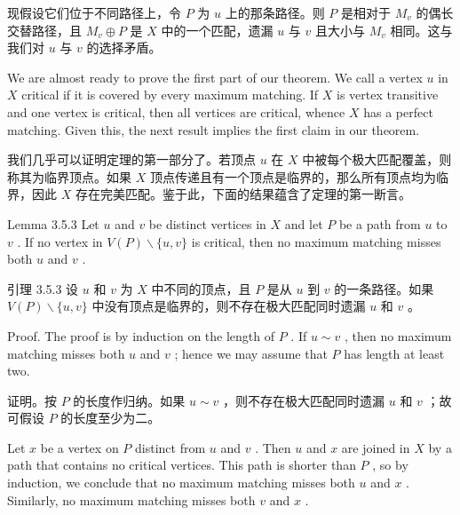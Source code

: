\documentclass[10pt]{article}
\begin{document}
\begin{tcolorbox}\relax
现假设它们位于不同路径上，令 \(P\) 为 \(u\) 上的那条路径。则 \(P\) 是相对于 \({M}_{v}\) 的偶长交替路径，且 \({M}_{v} \oplus  P\) 是 \(X\) 中的一个匹配，遗漏 \(u\) 与 \(v\) 且大小与 \({M}_{v}\) 相同。这与我们对 \(u\) 与 \(v\) 的选择矛盾。
\end{tcolorbox}

We are almost ready to prove the first part of our theorem. We call a vertex \(u\) in \(X\) critical if it is covered by every maximum matching. If \(X\) is vertex transitive and one vertex is critical, then all vertices are critical, whence \(X\) has a perfect matching. Given this, the next result implies the first claim in our theorem.

\begin{tcolorbox}\relax
我们几乎可以证明定理的第一部分了。若顶点 \(u\) 在 \(X\) 中被每个极大匹配覆盖，则称其为临界顶点。如果 \(X\) 顶点传递且有一个顶点是临界的，那么所有顶点均为临界，因此 \(X\) 存在完美匹配。鉴于此，下面的结果蕴含了定理的第一断言。
\end{tcolorbox}

Lemma 3.5.3 Let \(u\) and \(v\) be distinct vertices in \(X\) and let \(P\) be a path from \(u\) to \(v\) . If no vertex in \(V\left( P\right)  \smallsetminus  \{ u,v\}\) is critical, then no maximum matching misses both \(u\) and \(v\) .

\begin{tcolorbox}\relax
引理 3.5.3 设 \(u\) 和 \(v\) 为 \(X\) 中不同的顶点，且 \(P\) 是从 \(u\) 到 \(v\) 的一条路径。如果 \(V\left( P\right)  \smallsetminus  \{ u,v\}\) 中没有顶点是临界的，则不存在极大匹配同时遗漏 \(u\) 和 \(v\) 。
\end{tcolorbox}

Proof. The proof is by induction on the length of \(P\) . If \(u \sim  v\) , then no maximum matching misses both \(u\) and \(v\) ; hence we may assume that \(P\) has length at least two.

\begin{tcolorbox}\relax
证明。按 \(P\) 的长度作归纳。如果 \(u \sim  v\) ，则不存在极大匹配同时遗漏 \(u\) 和 \(v\) ；故可假设 \(P\) 的长度至少为二。
\end{tcolorbox}

Let \(x\) be a vertex on \(P\) distinct from \(u\) and \(v\) . Then \(u\) and \(x\) are joined in \(X\) by a path that contains no critical vertices. This path is shorter than \(P\) , so by induction, we conclude that no maximum matching misses both \(u\) and \(x\) . Similarly, no maximum matching misses both \(v\) and \(x\) .
\end{document}
